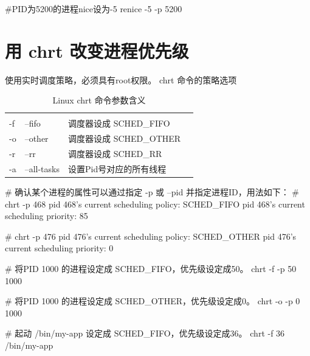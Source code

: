 \begin{latexcmd}[label=nice命令改变进程优先级]
#PID为5200的进程nice设为-5 
renice -5 -p 5200
\end{latexcmd}
\begin{tcolorbox}[colback=blue!5,colframe=blue!75!black,title=renice设置进程视频]
\end{tcolorbox}

\section{用 chrt 改变进程优先级}
使用实时调度策略，必须具有root权限。
chrt 命令的策略选项
\begin{table}[!htbp]
\stabbox{3.0cm}
{\caption{Linux chrt 命令参数含义}\label{}}
{\begin{tabular*}{\cflwidth}{@{\hspace{5pt}}@{\extracolsep{\fill}}*{4}{@{\hspace{-3pt}}l}}
     &   &               \\
    -f & --fifo   &  调度器设成 SCHED\_FIFO              \\
    -o & --other  &   调度器设成 SCHED\_OTHER            \\
    -r & --rr     &   调度器设成 SCHED\_RR           \\
    -a & --all-tasks &  设置Pid号对应的所有线程              \\
\end{tabular*}
\floatfoot*{}
}
\end{table}

\begin{latexcmd}[label=chrt使用方法]
# 确认某个进程的属性可以通过指定 -p 或 --pid 并指定进程ID，用法如下：
# chrt -p 468
pid 468's current scheduling policy: SCHED_FIFO
pid 468's current scheduling priority: 85

# chrt -p 476
pid 476's current scheduling policy: SCHED_OTHER
pid 476's current scheduling priority: 0

# 将PID 1000 的进程设定成 SCHED_FIFO，优先级设定成50。
chrt -f -p 50 1000

# 将PID 1000 的进程设定成 SCHED_OTHER，优先级设定成0。
chrt -o -p 0 1000

# 起动 /bin/my-app 设定成 SCHED_FIFO，优先级设定成36。
chrt -f 36 /bin/my-app
\end{latexcmd}
\begin{tcolorbox}[colback=blue!5,colframe=blue!75!black,title=chrt设置进程视频]
\end{tcolorbox}


